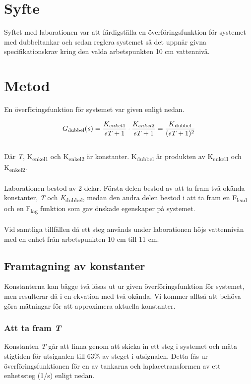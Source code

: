 \documentclass[a4wide]{article}
\begin{document}


\section{Syfte}
Syftet med laborationen var att färdigställa en överföringsfunktion för systemet med dubbeltankar och sedan reglera systemet så det uppnår givna specifikationskrav kring den valda arbetspunkten 10 cm vattennivå. 




\section{Metod}

En överföringsfunktion för systemet var given enligt nedan. 

\begin{equation}
G\textsubscript{dubbel}(s) = \frac{K_{enkel1}}{sT+1} \cdot \frac{K_{enkel2}}{sT+1} = \frac{K\textsubscript{dubbel}}{(sT+1)^2}
\end{equation}
\\
Där {\itshape T}, K\textsubscript{enkel1} och K\textsubscript{enkel2} är konstanter. K\textsubscript{dubbel} är produkten av K\textsubscript{enkel1} och K\textsubscript{enkel2}. 
\\
\\
Laborationen bestod av 2 delar. Första delen bestod av att ta fram två okända konstanter, {\itshape T} och {\itshape K}\textsubscript{dubbel}, medan den andra delen bestod i att ta fram en F\textsubscript{lead} och en F\textsubscript{lag} funktion som gav önskade egenskaper på systemet. 
\\
\\
Vid samtliga tillfällen då ett steg används under laborationen höjs vattennivån med en enhet från arbetspunkten 10 cm till 11 cm.


\subsection{Framtagning av konstanter}
Konstanterna kan bägge två lösas ut ur given överföringsfunktion för systemet, men resulterar då i en ekvation med två okända. Vi kommer alltså att behöva göra mätningar för att approximera aktuella konstanter. 



\subsubsection{Att ta fram {\itshape T}}
Konstanten {\itshape T} går att finna genom att skicka in ett steg i systemet och mäta stigtiden för utsignalen till 63\% av steget i utsignalen. Detta fås ur överföringsfunktionen för en av tankarna och laplacetransformen av ett enhetssteg (1/s) enligt nedan. 
\end{document}
